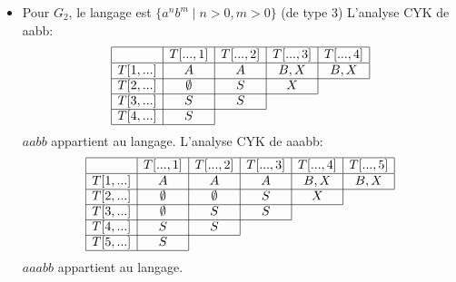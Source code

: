 \begin{corrections}
\begin{itemize}
  \item
    Pour $G_2$, le langage est $\{a^nb^m \mid  n > 0, m > 0\}$  (de type 3)
    L'analyse CYK de aabb:
    $$\begin{array}{|c|c|c|c|c|}
      \hline
      & T[...,1] & T[...,2] & T[...,3] & T[...,4]\\
      \hline
      T[1,...] & A & A & B,X & B,X \\
      \cline{1-5}
      T[2,...] & \emptyset  & S  & X \\
      \cline{1-4}
      T[3,...] & S & S  \\
      \cline{1-3}
      T[4,...]   & S \\
      \cline{1-2}
    \end{array}$$
    $aabb$ appartient au langage.
    L'analyse CYK de aaabb:
    $$\begin{array}{|c|c|c|c|c|c|}
      \hline
      & T[...,1] & T[...,2] & T[...,3] & T[...,4] & T[...,5]\\
      \hline
      T[1,...] & A & A & A & B,X & B,X \\
      \cline{1-6}
      T[2,...] & \emptyset  & \emptyset  & S  & X \\
      \cline{1-5}
      T[3,...] & \emptyset  & S & S  \\
      \cline{1-4}
      T[4,...]   & S  & S \\
      \cline{1-3}
      T[5,...]   & S  \\
      \cline{1-2}
    \end{array}$$
    $aaabb$ appartient au langage.
  \end{itemize}

\end{corrections}

\endgroup
\endinput

